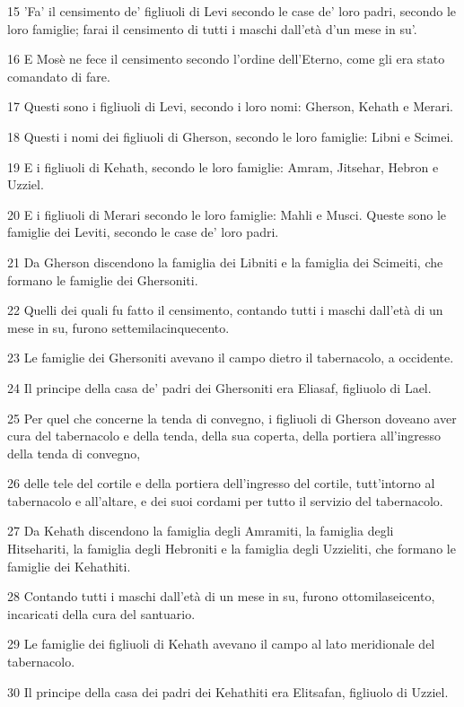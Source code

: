 \par 15 'Fa' il censimento de' figliuoli di Levi secondo le case de' loro padri, secondo le loro famiglie; farai il censimento di tutti i maschi dall'età d'un mese in su'.
\par 16 E Mosè ne fece il censimento secondo l'ordine dell'Eterno, come gli era stato comandato di fare.
\par 17 Questi sono i figliuoli di Levi, secondo i loro nomi: Gherson, Kehath e Merari.
\par 18 Questi i nomi dei figliuoli di Gherson, secondo le loro famiglie: Libni e Scimei.
\par 19 E i figliuoli di Kehath, secondo le loro famiglie: Amram, Jitsehar, Hebron e Uzziel.
\par 20 E i figliuoli di Merari secondo le loro famiglie: Mahli e Musci. Queste sono le famiglie dei Leviti, secondo le case de' loro padri.
\par 21 Da Gherson discendono la famiglia dei Libniti e la famiglia dei Scimeiti, che formano le famiglie dei Ghersoniti.
\par 22 Quelli dei quali fu fatto il censimento, contando tutti i maschi dall'età di un mese in su, furono settemilacinquecento.
\par 23 Le famiglie dei Ghersoniti avevano il campo dietro il tabernacolo, a occidente.
\par 24 Il principe della casa de' padri dei Ghersoniti era Eliasaf, figliuolo di Lael.
\par 25 Per quel che concerne la tenda di convegno, i figliuoli di Gherson doveano aver cura del tabernacolo e della tenda, della sua coperta, della portiera all'ingresso della tenda di convegno,
\par 26 delle tele del cortile e della portiera dell'ingresso del cortile, tutt'intorno al tabernacolo e all'altare, e dei suoi cordami per tutto il servizio del tabernacolo.
\par 27 Da Kehath discendono la famiglia degli Amramiti, la famiglia degli Hitsehariti, la famiglia degli Hebroniti e la famiglia degli Uzzieliti, che formano le famiglie dei Kehathiti.
\par 28 Contando tutti i maschi dall'età di un mese in su, furono ottomilaseicento, incaricati della cura del santuario.
\par 29 Le famiglie dei figliuoli di Kehath avevano il campo al lato meridionale del tabernacolo.
\par 30 Il principe della casa dei padri dei Kehathiti era Elitsafan, figliuolo di Uzziel.
